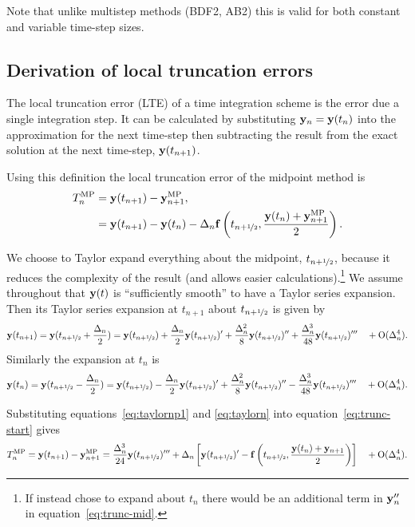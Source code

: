 Note that unlike multistep methods (\eg BDF2, AB2) this is valid for both constant and variable time-step sizes.


\subsection{Derivation of local truncation errors}
\label{sec:deriv-local-trunc}

The local truncation error (LTE) of a time integration scheme is the error due a single integration step.
It can be calculated by substituting $\mathbf{y}_n = \mathbf{y}(t_n)$ into the approximation for the next time-step then subtracting the result from the exact solution at the next time-step, $\mathbf{y}(t_{n+1})$.

Using this definition the local truncation error of the midpoint method is
\begin{align}
  T_n^{\text{MP}} &= \mathbf{y}(t_{n+1}) - \mathbf{y}_{n+1}^{\text{MP}}, \notag\\
  &= \mathbf{y}(t_{n+1}) - \mathbf{y}(t_n) - \Delta_{n} {\mathbf{f}}\left( t_{n+\nicefrac{1}{2}}, \frac{\mathbf{y}(t_n) + \mathbf{y}_{n+1}^{\text{MP}}}{2} \right).
  \label{eq:trunc-start}
\end{align}

We choose to Taylor expand everything about the midpoint, $t_{n+\nicefrac{1}{2}}$, because it reduces the complexity of the result (and allows easier calculations).\footnote{If instead chose to expand about $t_n$ there would be an additional term in $\mathbf{y}_n''$ in equation~\eqref{eq:trunc-mid}.}
We assume throughout that $\mathbf{y}(t)$ is ``sufficiently smooth'' to have a Taylor series expansion. Then its Taylor series expansion at $t_{n+1}$ about $t_{n+\nicefrac{1}{2}}$ is given by
\begin{equation}
  \mathbf{y}(t_{n+1}) = \mathbf{y}(t_{n+\nicefrac{1}{2}} + \frac{\Delta_{n}}{2}) = \mathbf{y}(t_{n+\nicefrac{1}{2}}) + \frac{\Delta_{n}}{2} \mathbf{y}(t_{n+\nicefrac{1}{2}})' + \frac{\Delta_{n}^2}{8} \mathbf{y}(t_{n+\nicefrac{1}{2}})'' + \frac{\Delta_{n}^3}{48} \mathbf{y}(t_{n+\nicefrac{1}{2}})''' \quad + \text{O}(\Delta_{n}^4).
  \label{eq:taylornp1}
\end{equation}
Similarly the expansion at $t_n$ is
\begin{equation}
  \mathbf{y}(t_n) = \mathbf{y}(t_{n+\nicefrac{1}{2}} - \frac{\Delta_{n}}{2}) = \mathbf{y}(t_{n+\nicefrac{1}{2}}) - \frac{\Delta_{n}}{2} \mathbf{y}(t_{n+\nicefrac{1}{2}})' + \frac{\Delta_{n}^2}{8} \mathbf{y}(t_{n+\nicefrac{1}{2}})'' - \frac{\Delta_{n}^3}{48} \mathbf{y}(t_{n+\nicefrac{1}{2}})''' \quad + \text{O}(\Delta_{n}^4).
  \label{eq:taylorn}
\end{equation}

Substituting equations~\eqref{eq:taylornp1} and \eqref{eq:taylorn} into equation~\eqref{eq:trunc-start} gives
\begin{equation}
  T_n^{\text{MP}} = \mathbf{y}(t_{n+1}) - \mathbf{y}_{n+1}^{\text{MP}}
  = \frac{\Delta_{n}^3}{24} \mathbf{y}(t_{n+\nicefrac{1}{2}})'''  + \Delta_{n}  \left[ \mathbf{y}(t_{n+\nicefrac{1}{2}})'
  - {\mathbf{f}}\left( t_{n+\nicefrac{1}{2}}, \frac{\mathbf{y}(t_n) + \mathbf{y}_{n+1}}{2} \right) \right]  \quad + \text{O}(\Delta_{n}^4).
  \label{eq:trunc-mid}
\end{equation}

